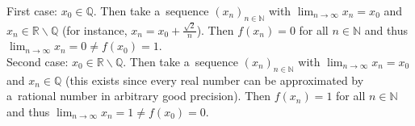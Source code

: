\begin{example}
\begin{enumerate}[a)]
First case: $x_0\in\mathbb{Q}$. Then take a~sequence $(x_n)_{n\in\mathbb{N}}$ with $\lim_{n\to \infty}x_n=x_0$ and $x_n\in\mathbb{R}\backslash\mathbb{Q}$ (for instance, $x_n=x_0+\frac{\sqrt{2}}{n}$). Then $f(x_n)=0$ for all $n\in\mathbb{N}$ and thus $\lim_{n\to \infty}x_n=0\neq f(x_0)=1$.\\
Second case: $x_0\in\mathbb{R}\backslash\mathbb{Q}$. Then take a~sequence $(x_n)_{n\in\mathbb{N}}$ with $\lim_{n\to \infty}x_n=x_0$ and $x_n\in\mathbb{Q}$ (this exists since every real number can be approximated by a~rational number in arbitrary good precision). Then $f(x_n)=1$ for all $n\in\mathbb{N}$ and thus $\lim_{n\to \infty}x_n=1\neq f(x_0)=0$.
\end{enumerate}
\end{example}


